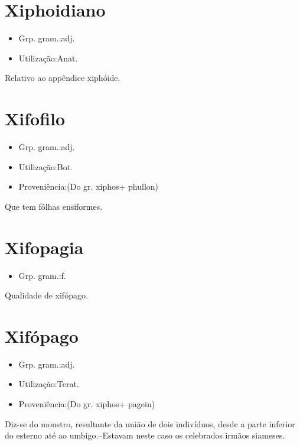 \section{Xiphoidiano}
\begin{itemize}
\item {Grp. gram.:adj.}
\end{itemize}
\begin{itemize}
\item {Utilização:Anat.}
\end{itemize}
Relativo ao appêndice xiphóide.
\section{Xifofilo}
\begin{itemize}
\item {Grp. gram.:adj.}
\end{itemize}
\begin{itemize}
\item {Utilização:Bot.}
\end{itemize}
\begin{itemize}
\item {Proveniência:(Do gr. \textunderscore xiphos\textunderscore  + \textunderscore phullon\textunderscore )}
\end{itemize}
Que tem fôlhas ensiformes.
\section{Xifopagia}
\begin{itemize}
\item {Grp. gram.:f.}
\end{itemize}
Qualidade de xifópago.
\section{Xifópago}
\begin{itemize}
\item {Grp. gram.:adj.}
\end{itemize}
\begin{itemize}
\item {Utilização:Terat.}
\end{itemize}
\begin{itemize}
\item {Proveniência:(Do gr. \textunderscore xiphos\textunderscore  + \textunderscore pagein\textunderscore )}
\end{itemize}
Diz-se do monstro, resultante da união de dois indivíduos, desde a parte inferior do esterno até ao umbigo.--Estavam neste caso os celebrados irmãos siameses.
